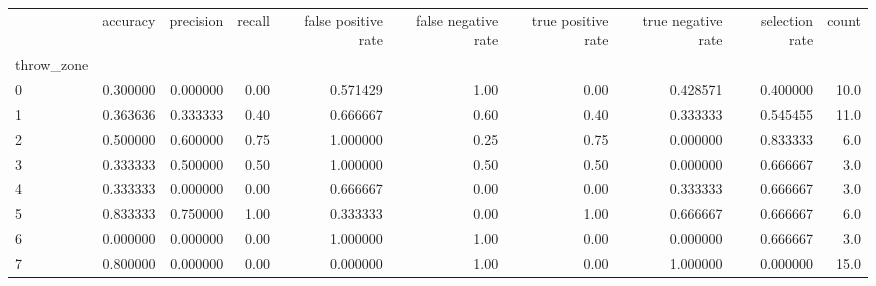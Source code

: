 \begin{tabular}{lrrrrrrrrr}
\toprule
{} &  accuracy &  precision &  recall &  false positive rate &  false negative rate &  true positive rate &  true negative rate &  selection rate &  count \\
throw\_zone &           &            &         &                      &                      &                     &                     &                 &        \\
\midrule
0          &  0.300000 &   0.000000 &    0.00 &             0.571429 &                 1.00 &                0.00 &            0.428571 &        0.400000 &   10.0 \\
1          &  0.363636 &   0.333333 &    0.40 &             0.666667 &                 0.60 &                0.40 &            0.333333 &        0.545455 &   11.0 \\
2          &  0.500000 &   0.600000 &    0.75 &             1.000000 &                 0.25 &                0.75 &            0.000000 &        0.833333 &    6.0 \\
3          &  0.333333 &   0.500000 &    0.50 &             1.000000 &                 0.50 &                0.50 &            0.000000 &        0.666667 &    3.0 \\
4          &  0.333333 &   0.000000 &    0.00 &             0.666667 &                 0.00 &                0.00 &            0.333333 &        0.666667 &    3.0 \\
5          &  0.833333 &   0.750000 &    1.00 &             0.333333 &                 0.00 &                1.00 &            0.666667 &        0.666667 &    6.0 \\
6          &  0.000000 &   0.000000 &    0.00 &             1.000000 &                 1.00 &                0.00 &            0.000000 &        0.666667 &    3.0 \\
7          &  0.800000 &   0.000000 &    0.00 &             0.000000 &                 1.00 &                0.00 &            1.000000 &        0.000000 &   15.0 \\
\bottomrule
\end{tabular}
